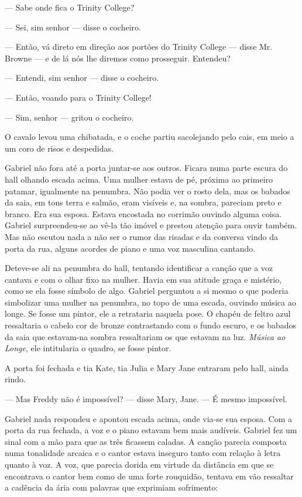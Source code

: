 --- Sabe onde fica o Trinity College?

--- Sei, sim senhor --- disse o cocheiro.

--- Então, vá direto em direção aos portões do Trinity College 
--- disse Mr. Browne --- e de lá nós lhe diremos como prosseguir.
Entendeu?

--- Entendi, sim senhor --- disse o cocheiro.

--- Então, voando para o Trinity College!

--- Sim, senhor --- gritou o cocheiro.

O cavalo levou uma chibatada, e o coche partiu sacolejando pelo cais,
em meio a um coro de risos e despedidas.

Gabriel não fora até a porta juntar-se aos outros. Ficara numa parte
escura do hall olhando escada acima. Uma mulher estava
de pé, próxima ao primeiro patamar, igualmente na penumbra. Não podia
ver o rosto dela, mas os babados da saia, em tons terra e salmão, eram
visíveis e, na sombra, pareciam preto e branco. Era sua esposa. Estava
encostada no corrimão ouvindo alguma coisa. Gabriel surpreendeu-se ao
vê-la tão imóvel e prestou atenção para ouvir também. Mas não
escutou nada a não ser o rumor das risadas e da conversa vindo da
porta da rua, alguns acordes de piano e uma voz masculina cantando.


Deteve-se ali na penumbra do hall, tentando identificar a canção que a
voz cantava e com o olhar fixo na mulher. Havia em sua atitude graça e
mistério, como se ela fosse símbolo de algo. Gabriel perguntou a si
mesmo o que poderia simbolizar uma mulher na penumbra, no topo de uma
escada, ouvindo música ao longe. Se fosse um pintor, ele a retrataria
naquela pose. O chapéu de feltro azul ressaltaria o cabelo cor de
bronze contrastando com o fundo escuro, e os babados da saia que
estavam-na sombra ressaltariam os que estavam na luz. \textit{Música ao Longe},
ele intitularia o quadro, se fosse pintor.

A porta foi fechada e tia Kate, tia Julia e Mary Jane entraram pelo
hall, ainda rindo.

--- Mas Freddy não é impossível? --- disse Mary, Jane. --- É mesmo
impossível.

Gabriel nada respondeu e apontou escada acima, onde via-se sua esposa.
Com a porta da rua fechada, a voz e o piano estavam bem mais
audíveis. Gabriel fez um sinal com a mão para que as três ficassem
caladas. A canção parecia composta numa tonalidade arcaica e o
cantor estava inseguro tanto com relação à letra quanto à voz. A voz,
que parecia dorida em virtude da distância em que se encontrava o
cantor bem como de uma forte rouquidão, tentava em vão ressaltar a
cadência da ária com palavras que exprimiam sofrimento:

